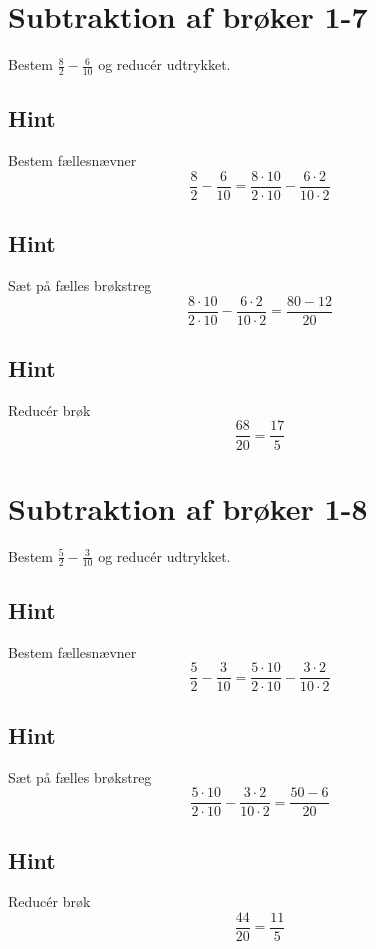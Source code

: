 \documentclass{article}
\newenvironment{exercise}[1]{\newpage\section{#1}}{}
\newcommand{\answerbox}[1]{\fbox{$#1$}}
\newcommand{\hint}{\subsection*{Hint}}
\begin{document}
	\newpage

\begin{exercise}{Subtraktion af brøker 1-7}
	
	Bestem $\frac{8}{2}-\frac{6}{10}$ og reducér udtrykket.
	
	\answerbox{\frac{17}{5}}
	
	\hint
	
	Bestem fællesnævner
	\[
	\frac{8}{2}-\frac{6}{10}  = \frac{8 \cdot 10}{2 \cdot 10}-\frac{6 \cdot 2}{10 \cdot 2} 
	\]
	
	\hint
	
	Sæt på fælles brøkstreg
	\[
	\frac{8 \cdot 10}{2 \cdot 10}-\frac{6 \cdot 2}{10 \cdot 2}    = \frac{80-12}{20} 
	\]
	
	\hint
	
	Reducér brøk
	\[
	\frac{68}{20} = \frac{17}{5}
	\]
	
\end{exercise}

	\newpage

\begin{exercise}{Subtraktion af brøker 1-8}
	
	Bestem $\frac{5}{2}-\frac{3}{10}$ og reducér udtrykket.
	
	\answerbox{\frac{11}{5}}
	
	\hint
	
	Bestem fællesnævner
	\[
	\frac{5}{2}-\frac{3}{10}  = \frac{5 \cdot 10}{2 \cdot 10}-\frac{3 \cdot 2}{10 \cdot 2} 
	\]
	
	\hint
	
	Sæt på fælles brøkstreg
	\[
	\frac{5 \cdot 10}{2 \cdot 10}-\frac{3 \cdot 2}{10 \cdot 2}     = \frac{50-6}{20} 
	\]
	
	\hint
	
	Reducér brøk
	\[
	\frac{44}{20} = \frac{11}{5}
	\]
	
\end{exercise}
	
\end{document}
